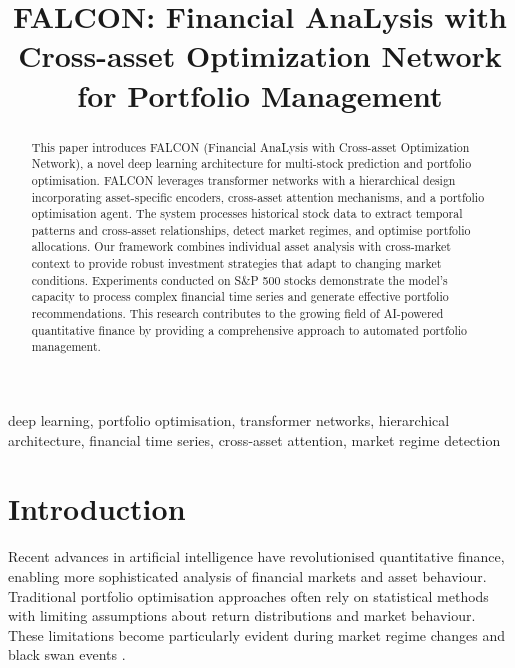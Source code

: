 \documentclass[conference]{IEEEtran}
\begin{document}
\title{FALCON: Financial AnaLysis with Cross-asset Optimization Network for Portfolio Management}

\author{
\and
{}
}

\maketitle

\begin{abstract}
This paper introduces FALCON (Financial AnaLysis with Cross-asset Optimization Network), a novel deep learning architecture for multi-stock prediction and portfolio optimisation. FALCON leverages transformer networks with a hierarchical design incorporating asset-specific encoders, cross-asset attention mechanisms, and a portfolio optimisation agent. The system processes historical stock data to extract temporal patterns and cross-asset relationships, detect market regimes, and optimise portfolio allocations. Our framework combines individual asset analysis with cross-market context to provide robust investment strategies that adapt to changing market conditions. Experiments conducted on S\&P 500 stocks demonstrate the model's capacity to process complex financial time series and generate effective portfolio recommendations. This research contributes to the growing field of AI-powered quantitative finance by providing a comprehensive approach to automated portfolio management.
\end{abstract}

\begin{IEEEkeywords}
deep learning, portfolio optimisation, transformer networks, hierarchical architecture, financial time series, cross-asset attention, market regime detection
\end{IEEEkeywords}

\section{Introduction}
Recent advances in artificial intelligence have revolutionised quantitative finance, enabling more sophisticated analysis of financial markets and asset behaviour. Traditional portfolio optimisation approaches often rely on statistical methods with limiting assumptions about return distributions and market behaviour. These limitations become particularly evident during market regime changes and black swan events \cite{taleb2007black}.
\end{document}

